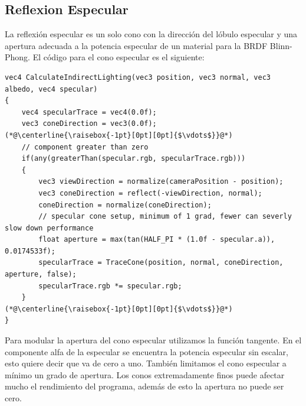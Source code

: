 \subsection{Reflexion Especular} %
\label{sub:reflexion_especular}
La reflexión especular es un solo cono con la dirección del lóbulo especular y una apertura adecuada a la potencia especular de un material para la \ac{BRDF} Blinn-Phong. El código para el cono especular es el siguiente:
\\
\begin{lstlisting}[caption={Cono para reflexion especular.}, label=Trace4]
vec4 CalculateIndirectLighting(vec3 position, vec3 normal, vec3 albedo, vec4 specular)
{
    vec4 specularTrace = vec4(0.0f);
    vec3 coneDirection = vec3(0.0f);
(*@\centerline{\raisebox{-1pt}[0pt][0pt]{$\vdots$}}@*)
    // component greater than zero
    if(any(greaterThan(specular.rgb, specularTrace.rgb)))
    {
        vec3 viewDirection = normalize(cameraPosition - position);
        vec3 coneDirection = reflect(-viewDirection, normal);
        coneDirection = normalize(coneDirection);
        // specular cone setup, minimum of 1 grad, fewer can severly slow down performance
        float aperture = max(tan(HALF_PI * (1.0f - specular.a)), 0.0174533f);
        specularTrace = TraceCone(position, normal, coneDirection, aperture, false);
        specularTrace.rgb *= specular.rgb;
    }
(*@\centerline{\raisebox{-1pt}[0pt][0pt]{$\vdots$}}@*)
}
\end{lstlisting}
Para modular la apertura del cono especular utilizamos la función tangente. En el componente alfa de la especular se encuentra la potencia especular sin escalar, esto quiere decir que va de cero a uno. También limitamos el cono especular a mínimo un grado de apertura. Los conos extremadamente finos puede afectar mucho el rendimiento del programa, además de esto la apertura no puede ser cero.
